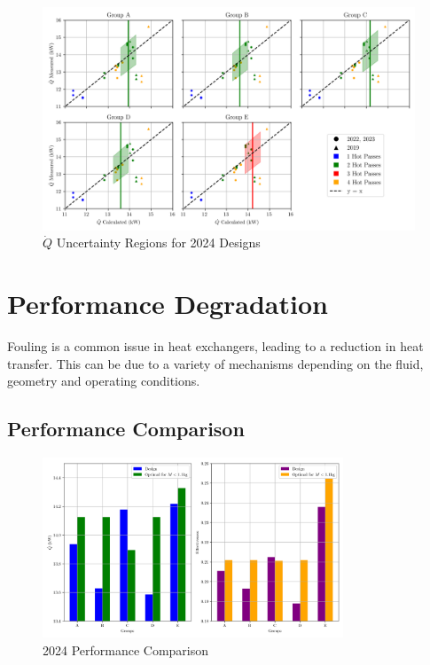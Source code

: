 \documentclass{article}
\begin{document}
\begin{figure}[H]
    \centering
    \includegraphics[width=0.99\textwidth]{Qdot_uncertainty_bands.png}
    \caption{$\dot{Q}$ Uncertainty Regions for 2024 Designs}
    \label{fig:uncertainty}
\end{figure}

\section{Performance Degradation}

Fouling is a common issue in heat exchangers, leading to a reduction in heat transfer.
This can be due to a variety of mechanisms depending on the fluid, geometry and operating conditions.

\subsection{Performance Comparison}


\begin{figure}[H]
    \centering
    \includegraphics[width=0.8\textwidth]{2024comparison.png}
    \caption{2024 Performance Comparison}
    \label{fig:2024_performance}
\end{figure}
\end{document}
